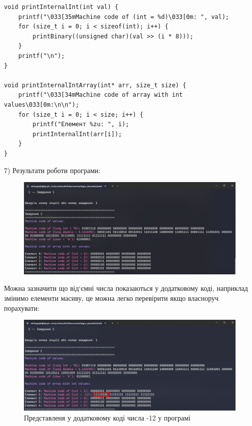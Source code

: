 \begin{lstlisting}[style=customc]
void printInternalInt(int val) {
    printf("\033[35mMachine code of (int = %d)\033[0m: ", val);
    for (size_t i = 0; i < sizeof(int); i++) {
        printBinary((unsigned char)(val >> (i * 8)));
    }
    printf("\n");
}

void printInternalIntArray(int* arr, size_t size) {
    printf("\033[34mMachine code of array with int values\033[0m:\n\n");
    for (size_t i = 0; i < size; i++) {
        printf("Елемент %zu: ", i);
        printInternalInt(arr[i]);
    }
}
\end{lstlisting}

7) Результати роботи програми:
\begin{figure}[h!]
    \centering
    \includegraphics[width=16cm]{reports/algos/lab3/assets/2.png}
\end{figure}

\clearpage
Можна зазначити що від`ємні числа показаються у додатковому коді, наприклад змінимо елементи масиву, це можна легко перевірити якщо власноруч порахувати:
\begin{figure}[h!]
    \centering
    \includegraphics[width=16cm]{reports/algos/lab3/assets/3.png}
    \caption{Представленя у додатковому коді числа -12 у програмі}
\end{figure}

